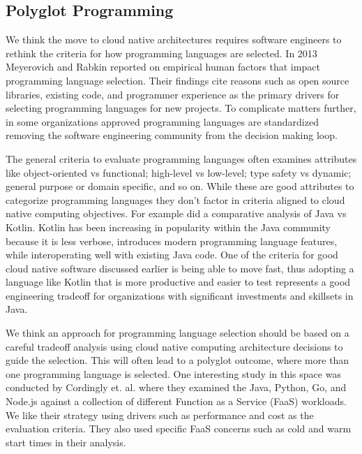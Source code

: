 \documentclass[conference]{IEEEtran}
\begin{document}
\subsection{Polyglot Programming}
We think the move to cloud native architectures requires software engineers to rethink the criteria for how programming languages are selected.  In 2013 Meyerovich and Rabkin\cite{meyerovich2013empirical} reported on empirical human factors that impact programming language selection.  Their findings cite reasons such as open source libraries, existing code, and programmer experience as the primary drivers for selecting programming languages for new projects. To complicate matters further, in some organizations approved programming languages are standardized removing the software engineering community from the decision making loop.

The general criteria to evaluate programming languages often examines attributes like object-oriented vs functional; high-level vs low-level; type safety vs dynamic; general purpose or domain specific, and so on.  While these are good attributes to categorize programming languages they don't factor in criteria aligned to cloud native computing objectives.  For example\cite{flauzino2018you} did a comparative analysis of Java vs Kotlin.  Kotlin has been increasing in popularity within the Java community because it is less verbose, introduces modern programming language features, while interoperating well with existing Java code.  One of the criteria for good cloud native software discussed earlier is being able to move fast, thus adopting a language like Kotlin that is more productive and easier to test represents a good engineering tradeoff for organizations with significant investments and skillsets in Java. 

We think an approach for programming language selection should be based on a careful tradeoff analysis using cloud native computing architecture decisions to guide the selection.  This will often lead to a polyglot outcome, where more than one programming language is selected.  One interesting study in this space was conducted by Cordingly et. al.\cite{Serverless} where they examined the Java, Python, Go, and Node.js against a collection of different Function as a Service (FaaS) workloads.  We like their strategy using drivers such as performance and cost as the evaluation criteria.  They also used specific FaaS concerns such as cold and warm start times in their analysis. 
\end{document}
